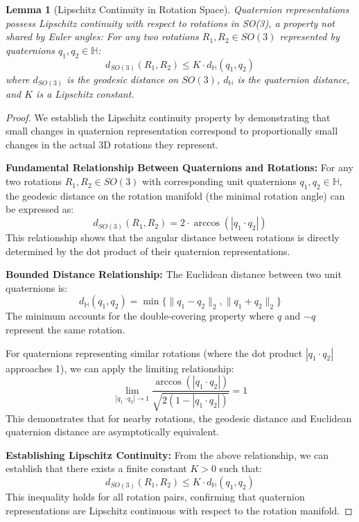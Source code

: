 \documentclass[journal]{IEEEtran}
\theoremstyle{plain}
\newtheorem{lemma}{Lemma}
\begin{document}
\begin{lemma}[Lipschitz Continuity in Rotation Space]
Quaternion representations possess Lipschitz continuity with respect to rotations in SO(3), a property not shared by Euler angles:
For any two rotations $R_1, R_2 \in SO(3)$ represented by quaternions $q_1, q_2 \in \mathbb{H}$:
\begin{equation}
d_{SO(3)}(R_1, R_2) \leq K \cdot d_{\mathbb{H}}(q_1, q_2)
\end{equation}
where $d_{SO(3)}$ is the geodesic distance on $SO(3)$, $d_{\mathbb{H}}$ is the quaternion distance, and $K$ is a Lipschitz constant.
\end{lemma}
\begin{proof}
We establish the Lipschitz continuity property by demonstrating that small changes in quaternion representation correspond to proportionally small changes in the actual 3D rotations they represent.

\textbf{Fundamental Relationship Between Quaternions and Rotations:}
For any two rotations $R_1, R_2 \in SO(3)$ with corresponding unit quaternions $q_1, q_2 \in \mathbb{H}$, the geodesic distance on the rotation manifold (the minimal rotation angle) can be expressed as:
\begin{equation}
d_{SO(3)}(R_1, R_2) = 2 \cdot \arccos(|q_1 \cdot q_2|)
\end{equation}
This relationship shows that the angular distance between rotations is directly determined by the dot product of their quaternion representations.

\textbf{Bounded Distance Relationship:}
The Euclidean distance between two unit quaternions is:
\begin{equation}
d_{\mathbb{H}}(q_1, q_2) = \min\{\|q_1 - q_2\|_2, \|q_1 + q_2\|_2\}
\end{equation}
The minimum accounts for the double-covering property where $q$ and $-q$ represent the same rotation.

For quaternions representing similar rotations (where the dot product $|q_1 \cdot q_2|$ approaches 1), we can apply the limiting relationship:
\begin{equation}
\lim_{|q_1 \cdot q_2| \to 1} \frac{\arccos(|q_1 \cdot q_2|)}{\sqrt{2(1 - |q_1 \cdot q_2|)}} = 1
\end{equation}
This demonstrates that for nearby rotations, the geodesic distance and Euclidean quaternion distance are asymptotically equivalent.

\textbf{Establishing Lipschitz Continuity:}
From the above relationship, we can establish that there exists a finite constant $K > 0$ such that:
\begin{equation}
d_{SO(3)}(R_1, R_2) \leq K \cdot d_{\mathbb{H}}(q_1, q_2)
\end{equation}
This inequality holds for all rotation pairs, confirming that quaternion representations are Lipschitz continuous with respect to the rotation manifold.


\end{proof}
\end{document}
